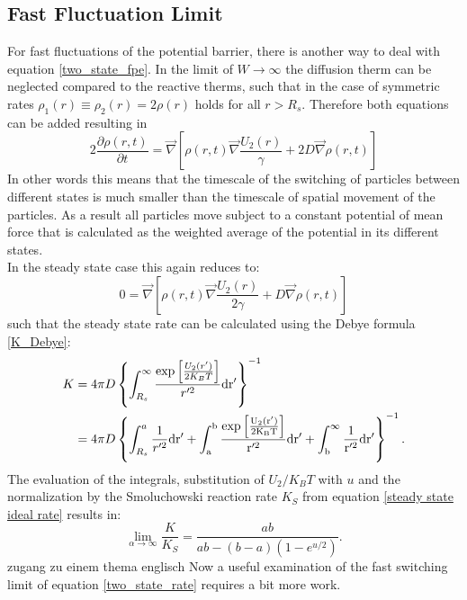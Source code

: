 \subsection{Fast Fluctuation Limit}
For fast fluctuations of the potential barrier, there is another way to deal with equation \eqref{two_state_fpe}. In the limit of $W \rightarrow \infty$ the diffusion therm can be neglected compared to the reactive therms, such that in the case of symmetric rates $\rho_1(r) \equiv \rho_2(r) = 2\rho(r)$ holds for all $r>R_s$. Therefore both equations can be added resulting in 
\begin{equation}
    2 \frac{\partial \rho(r,t)}{\partial t} = \vec \nabla \left[\rho(r,t) \vec \nabla \frac{U_2(r)}{\gamma} + 2 D \vec \nabla \rho(r,t) \right]
    \label{fast_limit_fpe}
\end{equation} 
In other words this means that the timescale of the switching of particles between different states is much smaller than the timescale of spatial movement of the particles. As a result all particles move subject to a constant potential of mean force that is calculated as the weighted average of the potential in its different states. \\
In the steady state case this again reduces to:
\begin{equation}
    0 = \vec \nabla \left[\rho(r,t) \vec \nabla \frac{U_2(r)}{2\gamma} + D \vec \nabla \rho(r,t) \right]
\end{equation}
such that the steady state rate can be calculated using the Debye formula \eqref{K_Debye}:
\begin{align}
    K &=  4 \pi D \left\{\int_{R_s}^{\infty} \frac{\exp \left[ \frac{U_2(r')}{2 K_B T}\right]}{r'^2} \rm d r' \right\}^{-1} \nonumber \\
    &= 4 \pi D \left\{\int_{R_s}^{a} \frac{1}{r'^2} \rm d r' + \int_{a}^{b} \frac{\exp \left[ \frac{U_2(r')}{2K_B T}\right]}{r'^2} \rm d r' + \int_{b}^{\infty} \frac{1}{r'^2} \rm d r' \right\}^{-1}.
    \label{mean_potential_rate}
\end{align}
The evaluation of the integrals, substitution of $U_2/K_B T$ with $u$ and the normalization by the Smoluchowski reaction rate $K_S$ from equation \eqref{steady state ideal rate} results in:
\begin{equation}
    \lim_{\alpha \rightarrow \infty} \frac{K}{K_S} = \frac{ab}{ab - (b-a)(1-e^{u/2})}.
    \label{K_fast_limit_1}
\end{equation}zugang zu einem thema englisch
Now a useful examination of the fast switching limit of equation \eqref{two_state_rate} requires a bit more work.
